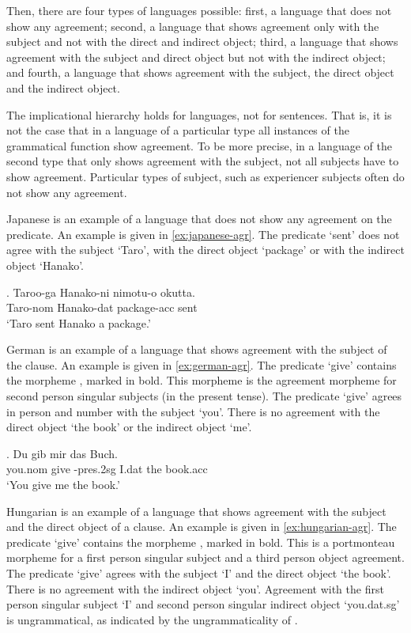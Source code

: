 Then, there are four types of languages possible: first, a language that does not show any agreement; second, a language that shows agreement only with the subject and not with the direct and indirect object; third, a language that shows agreement with the subject and direct object but not with the indirect object; and fourth, a language that shows agreement with the subject, the direct object and the indirect object.

The implicational hierarchy holds for languages, not for sentences. That is, it is not the case that in a language of a particular type all instances of the grammatical function show agreement. To be more precise, in a language of the second type that only shows agreement with the subject, not all subjects have to show agreement. Particular types of subject, such as experiencer subjects often do not show any agreement.

Japanese is an example of a language that does not show any agreement on the predicate. An example is given in \ref{ex:japanese-agr}. The predicate  `sent' does not agree with the subject  `Taro', with the direct object  `package' or with the indirect object  `Hanako'.

\exg. Taroo-ga Hanako-ni nimotu-o okutta.\\
 Taro-\ac{nom} Hanako-\ac{dat} package-\ac{acc} sent\\
 `Taro sent Hanako a package.' \label{ex:japanese-agr}

German is an example of a language that shows agreement with the subject of the clause. An example is given in \ref{ex:german-agr}. The predicate  `give' contains the morpheme , marked in bold. This morpheme is the agreement morpheme for second person singular subjects (in the present tense). The predicate  `give' agrees in person and number with the subject  `you'. There is no agreement with the direct object  `the book' or the indirect object  `me'.

\exg. Du gib  mir {das Buch}.\\
 you.\ac{nom} give -\ac{pres}.2\ac{sg} I.\ac{dat} {the book.\ac{acc}}\\
 `You give me the book.' \label{ex:german-agr}

Hungarian is an example of a language that shows agreement with the subject and the direct object of a clause. An example is given in \ref{ex:hungarian-agr}. The predicate  `give' contains the morpheme , marked in bold. This is a portmonteau morpheme for a first person singular subject and a third person object agreement. The predicate  `give' agrees with the subject  `I' and the direct object  `the book'. There is no agreement with the indirect object  `you'. Agreement with the first person singular subject  `I' and second person singular indirect object  `you.\ac{dat}.\ac{sg}' is ungrammatical, as indicated by the ungrammaticality of .

